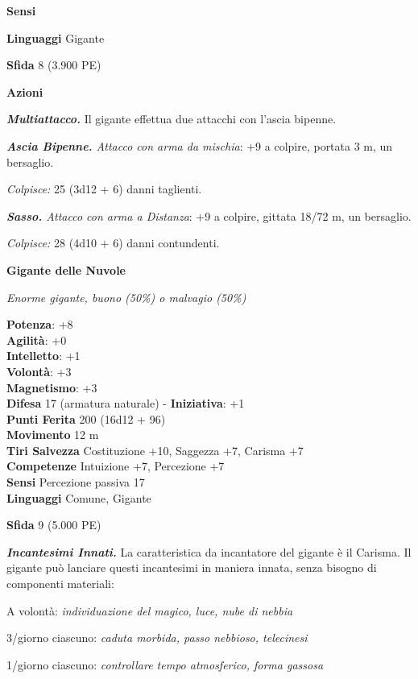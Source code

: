 \begin{multicols}{2}
\textbf{Sensi} 

\textbf{Linguaggi} Gigante

\textbf{Sfida} 8 (3.900 PE)\smallskip

\smallskip\textbf{Azioni}

\emph{\textbf{Multiattacco.}} Il gigante effettua due attacchi con
l'ascia bipenne.

\emph{\textbf{Ascia Bipenne.} Attacco con arma da mischia}: +9 a
colpire, portata 3 m, un bersaglio.

\emph{Colpisce:} 25 (3d12 + 6) danni taglienti.

\emph{\textbf{Sasso.} Attacco con arma a Distanza}: +9 a colpire,
gittata 18/72 m, un bersaglio.

\emph{Colpisce:} 28 (4d10 + 6) danni contundenti.

\medskip\textbf{Gigante delle Nuvole}

\emph{Enorme gigante, buono (50\%) o malvagio (50\%)}

\textbf{Potenza}: +8 \\
\textbf{Agilità}: +0\\
\textbf{Intelletto}: +1\\
\textbf{Volontà}: +3\\
\textbf{Magnetismo}: +3\\
\textbf{Difesa} 17 (armatura naturale) - \textbf{Iniziativa}: +1\\
\textbf{Punti Ferita} 200 (16d12 + 96)\\
\textbf{Movimento} 12 m\\
\textbf{Tiri Salvezza} Costituzione +10, Saggezza +7, Carisma +7\\
\textbf{Competenze} Intuizione +7, Percezione +7\\
\textbf{Sensi} Percezione passiva 17\\

\textbf{Linguaggi} Comune, Gigante

\textbf{Sfida} 9 (5.000 PE)\smallskip

\emph{\textbf{Incantesimi Innati.}} La caratteristica da incantatore del
gigante è il Carisma. Il gigante può lanciare questi incantesimi in
maniera innata, senza bisogno di componenti materiali:

A volontà: \emph{individuazione del magico, luce, nube di nebbia}

3/giorno ciascuno: \emph{caduta morbida, passo nebbioso, telecinesi}

1/giorno ciascuno: \emph{controllare tempo atmosferico, forma gassosa}


\end{multicols}
